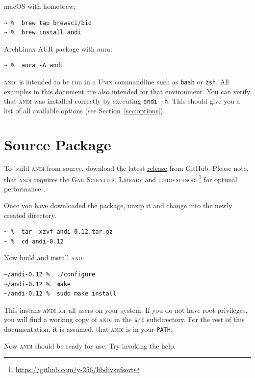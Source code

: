 \documentclass[a4paper,
  10pt,
  english,
  DIV=12,
  BCOR=8mm]{scrbook}
\newcommand{\algo}[1]{\textsc{{#1}}}
\newcommand{\andi}{\algo{andi}\xspace}
\begin{document}
\noindent macOS with homebrew:

\begin{lstlisting}
~ %  brew tap brewsci/bio
~ %  brew install andi
\end{lstlisting}

\noindent ArchLinux AUR package with aura:

\begin{lstlisting}
~ %  aura -A andi
\end{lstlisting}

\andi is intended to be run in a \algo{Unix} commandline such as \lstinline$bash$ or \lstinline$zsh$. All examples in this document are also intended for that environment. You can verify that \andi was installed correctly by executing \lstinline$andi -h$. This should give you a list of all available options (see Section~\ref{sec:options}).

\section{Source Package} \label{sub:regular}

To build \andi from source, download the latest \href{https://github.com/EvolBioInf/andi/releases}{release} from GitHub. Please note, that \andi requires the \algo{Gnu Scientific Library} and \algo{libdivsufsort}\footnote{\url{https://github.com/y-256/libdivsufsort}} for optimal performance \cite{divsufsort}.

Once you have downloaded the package, unzip it and change into the newly created directory. 

\begin{lstlisting}
~ %  tar -xzvf andi-0.12.tar.gz
~ %  cd andi-0.12
\end{lstlisting}

\noindent Now build and install \andi.

\begin{lstlisting}
~/andi-0.12 %  ./configure
~/andi-0.12 %  make
~/andi-0.12 %  sudo make install
\end{lstlisting}

\noindent This installs \andi for all users on your system. If you do not have root privileges, you will find a working copy of \andi in the \lstinline$src$ subdirectory. For the rest of this documentation, it is assumed, that \andi is in your \textdollar\lstinline!PATH!.

Now \andi should be ready for use. Try invoking the help.
\end{document}
